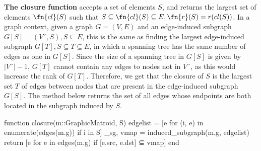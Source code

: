 \textbf{The closure function} accepts a set of elements $S$, and returns the largest set of elements $\fn{cl}(S)$ such that $S \subseteq \fn{cl}(S) \subseteq E, \fn{r}(S) = r(cl(S))$. In a graph context, given a graph $G=(V,E)$ and an edge-induced subgraph $G[S] = (V´, S), S\subseteq E$, this is the same as finding the largest edge-induced subgraph $G[T], S\subseteq T\subseteq E$, in which a spanning tree has the same number of edges as one in $G[S]$. Since the size of a spanning tree in $G[S]$ is given by $|V´|-1$, $G[T]$ cannot contain any edges to nodes not in $V´$, as this would increase the rank of $G[T]$. Therefore, we get that the closure of $S$ is the largest set $T$ of edges between nodes that are present in the edge-induced subgraph $G[S]$. The method  below returns the set of all edges whose endpoints are both located in the subgraph induced by $S$.
\begin{jllisting}
function closure(m::GraphicMatroid, S)
  edgelist = [e for (i, e) in enumerate(edges(m.g)) if i in S]
  _sg, vmap = induced_subgraph(m.g, edgelist)
  return [e for e in edges(m.g) if [e.src, e.dst] ⊆ vmap]
end
\end{jllisting}


